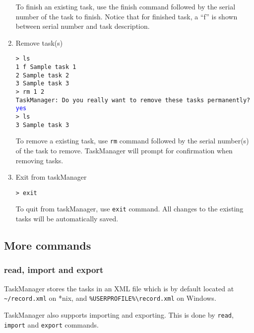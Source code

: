 \documentclass[12pt, a4paper]{article}
\begin{document}
\begin{enumerate}
To finish an existing task, use the finish command followed by the serial number of the task to finish. 
Notice that for finished task, a ``f'' is shown between serial number and task description.

\item Remove task(s)

\texttt{\textgreater \ ls\\
    1 f Sample task 1\\
    2   Sample task 2\\
    3   Sample task 3\\
    \textgreater \ rm 1 2\\
    TaskManager: Do you really want to remove these tasks permanently? \textcolor{blue}{yes}\\
    \textgreater \ ls\\
    3   Sample task 3}

To remove a existing task, use \texttt{rm} command followed by the serial number(s) of the task to remove. TaskManager will prompt for confirmation when removing tasks.

\item Exit from taskManager

\texttt{\textgreater \ exit}

To quit from taskManager, use \texttt{exit} command. 
All changes to the existing tasks will be automatically saved.
\end{enumerate}

\subsection{More commands}
\subsubsection{read, import and export}

TaskManager stores the tasks in an XML file which is by default located at
\texttt{\~{}/record.xml} on *nix, and \texttt{\%USERPROFILE\%\textbackslash record.xml} on Windows.

TaskManager also supports importing and exporting. This is done by \texttt{read}, \texttt{import} and \texttt{export} commands.
\end{document}
